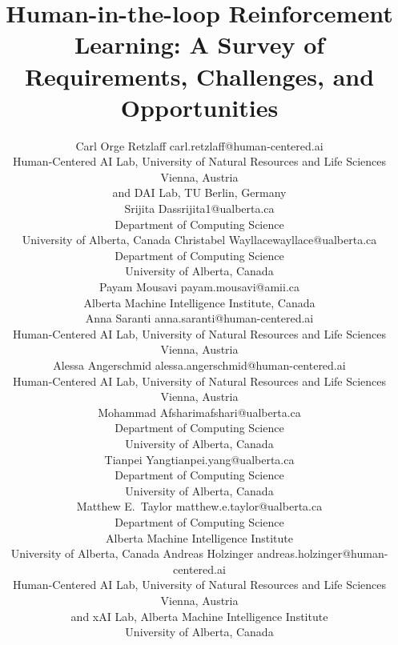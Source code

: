 \documentclass[twoside,11pt]{article}
\begin{document}
\title{Human-in-the-loop Reinforcement Learning: A Survey of Requirements, Challenges, and Opportunities}

\author{\name Carl Orge Retzlaff \email carl.retzlaff@human-centered.ai\\ 
\addr Human-Centered AI Lab, University of Natural Resources and Life Sciences Vienna, Austria\\
and DAI Lab, TU Berlin, Germany\\
\AND
\name Srijita Das\email srijita1@ualberta.ca \\
\addr Department of Computing Science \\ 
University of Alberta, Canada
\AND
\name Christabel Wayllace\email wayllace@ualberta.ca \\
\addr Department of Computing Science \\ University of Alberta, Canada\\
\AND
\name Payam Mousavi \email payam.mousavi@amii.ca \\
\addr Alberta Machine Intelligence Institute, Canada\\
\AND
\name Anna Saranti \email anna.saranti@human-centered.ai \\
\addr Human-Centered AI Lab, University of Natural Resources and Life Sciences Vienna, Austria\\
\AND
\name Alessa Angerschmid \email alessa.angerschmid@human-centered.ai \\
\addr Human-Centered AI Lab, University of Natural Resources and Life Sciences Vienna, Austria\\
\AND
\name Mohammad Afshari\email mafshari@ualberta.ca \\
\addr Department of Computing Science \\ University of Alberta, Canada\\
\AND
\name Tianpei Yang\email tianpei.yang@ualberta.ca \\
\addr Department of Computing Science \\ University of Alberta, Canada\\
\AND
\name Matthew E.~Taylor \email matthew.e.taylor@ualberta.ca \\
\addr Department of Computing Science\\
Alberta Machine Intelligence Institute\\
University of Alberta, Canada
\AND
\name Andreas Holzinger \email andreas.holzinger@human-centered.ai \\
\addr Human-Centered AI Lab, University of Natural Resources and Life Sciences Vienna, Austria \\
and xAI Lab, Alberta Machine Intelligence Institute\\
University of Alberta, Canada
}
\end{document}
